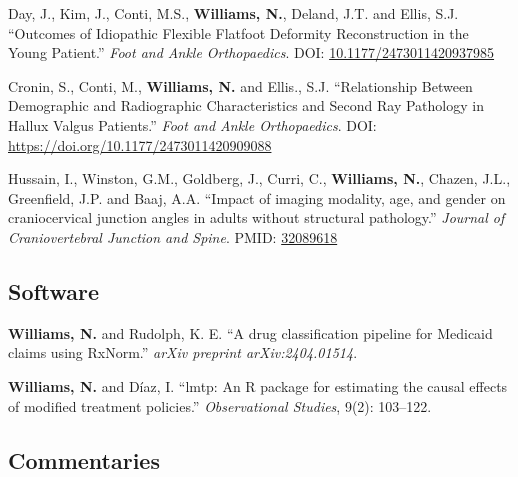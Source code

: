 \documentclass[12pt,letterpaper]{report}
\begin{document}
\begin{tablist}
	\item[2020] \tab Day, J., Kim, J., Conti, M.S., \textbf{Williams, N.}, Deland, J.T. and Ellis, S.J. \enquote{Outcomes of Idiopathic Flexible Flatfoot Deformity Reconstruction in the Young Patient.} \textit{Foot and Ankle Orthopaedics}. DOI: \href{https://doi.org/10.1177/2473011420937985}{10.1177/2473011420937985}
	
	\item[2020] \tab Cronin, S., Conti, M., \textbf{Williams, N.} and Ellis., S.J. \enquote{Relationship Between Demographic and Radiographic Characteristics and Second Ray Pathology in Hallux Valgus Patients.} \textit{Foot and Ankle Orthopaedics}. DOI: \href{https://doi.org/10.1177/2473011420909088}{https://doi.org/10.1177/2473011420909088}

	\item[2019] \tab Hussain, I., Winston, G.M., Goldberg, J., Curri, C., \textbf{Williams, N.}, Chazen, J.L., Greenfield, J.P. and Baaj, A.A. \enquote{Impact of imaging modality, age, and gender on craniocervical junction angles in adults without structural pathology.} \textit{Journal of Craniovertebral Junction and Spine}. PMID: \href{https://www.ncbi.nlm.nih.gov/pubmed/32089618}{32089618}

    \end{tablist}
    
    \subsection*{Software}
    
    \begin{tablist}
    
    \item[2024] \tab \textbf{Williams, N.} and Rudolph, K. E. \enquote{A drug classification pipeline for Medicaid claims using RxNorm.} \textit{arXiv preprint arXiv:2404.01514}.
    
    \item[2023] \tab \textbf{Williams, N.} and Díaz, I. \enquote{lmtp: An R package for estimating the causal effects of modified treatment policies.} \textit{Observational Studies}, 9(2): 103--122.
    
    \end{tablist}
    
    \subsection*{Commentaries}
    
\end{document}
